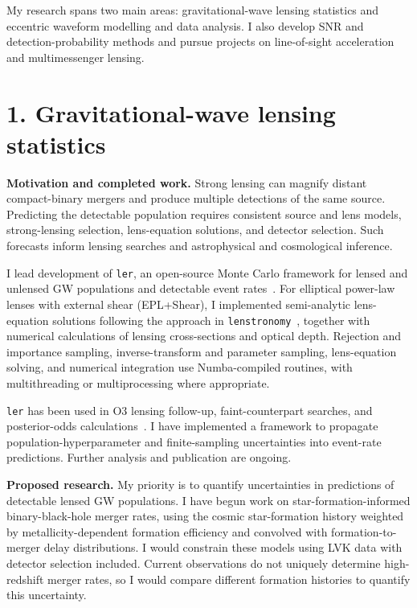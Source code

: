 \documentclass[11pt]{article}
\begin{document}

My research spans two main areas: gravitational-wave lensing statistics and eccentric waveform modelling and data analysis. I also develop SNR and detection-probability methods and pursue projects on line-of-sight acceleration and multimessenger lensing.

\section*{1. Gravitational-wave lensing statistics}

\textbf{Motivation and completed work.} Strong lensing can magnify distant compact-binary mergers and produce multiple detections of the same source. Predicting the detectable population requires consistent source and lens models, strong-lensing selection, lens-equation solutions, and detector selection. Such forecasts inform lensing searches and astrophysical and cosmological inference.

I lead development of \texttt{ler}, an open-source Monte Carlo framework for lensed and unlensed GW populations and detectable event rates~\cite{ler}. For elliptical power-law lenses with external shear (EPL+Shear), I implemented semi-analytic lens-equation solutions following the approach in \texttt{lenstronomy}~\cite{lenstronomy}, together with numerical calculations of lensing cross-sections and optical depth. Rejection and importance sampling, inverse-transform and parameter sampling, lens-equation solving, and numerical integration use Numba-compiled routines, with multithreading or multiprocessing where appropriate.

\texttt{ler} has been used in O3 lensing follow-up, faint-counterpart searches, and posterior-odds calculations~\cite{o3,ng,odds}. I have implemented a framework to propagate population-hyperparameter and finite-sampling uncertainties into event-rate predictions. Further analysis and publication are ongoing.

\textbf{Proposed research.} My priority is to quantify uncertainties in predictions of detectable lensed GW populations. I have begun work on star-formation-informed binary-black-hole merger rates, using the cosmic star-formation history weighted by metallicity-dependent formation efficiency and convolved with formation-to-merger delay distributions. I would constrain these models using LVK data with detector selection included. Current observations do not uniquely determine high-redshift merger rates, so I would compare different formation histories to quantify this uncertainty.
\end{document}
